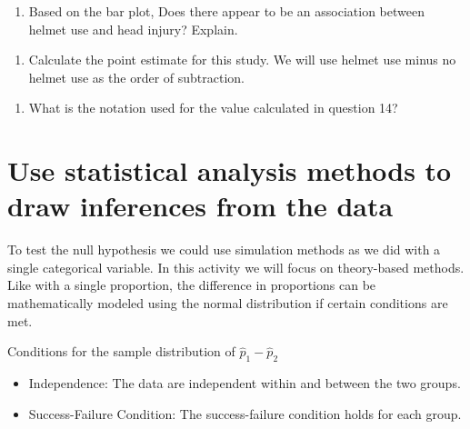 \documentclass[
]{report}
\providecommand{\tightlist}{%
  \setlength{\itemsep}{0pt}\setlength{\parskip}{0pt}}
\begin{document}
\vspace{1in}

\begin{enumerate}
\def\labelenumi{\arabic{enumi}.}
\setcounter{enumi}{12}
\tightlist
\item
  Based on the bar plot, Does there appear to be an association between helmet use and head injury? Explain.
\end{enumerate}

\vspace{1in}

\begin{enumerate}
\def\labelenumi{\arabic{enumi}.}
\setcounter{enumi}{13}
\tightlist
\item
  Calculate the point estimate for this study. We will use helmet use minus no helmet use as the order of subtraction.
\end{enumerate}

\vspace{1in}

\begin{enumerate}
\def\labelenumi{\arabic{enumi}.}
\setcounter{enumi}{14}
\tightlist
\item
  What is the notation used for the value calculated in question 14?
\end{enumerate}

\vspace{0.5in}

\hypertarget{use-statistical-analysis-methods-to-draw-inferences-from-the-data}{%
\section{Use statistical analysis methods to draw inferences from the data}\label{use-statistical-analysis-methods-to-draw-inferences-from-the-data}}

To test the null hypothesis we could use simulation methods as we did with a single categorical variable. In this activity we will focus on theory-based methods. Like with a single proportion, the difference in proportions can be mathematically modeled using the normal distribution if certain conditions are met.

Conditions for the sample distribution of \(\hat{p}_1-\hat{p}_2\)

\begin{itemize}
\item
  Independence: The data are independent within and between the two groups.
\item
  Success-Failure Condition: The success-failure condition holds for each group.
\end{itemize}
\end{document}
